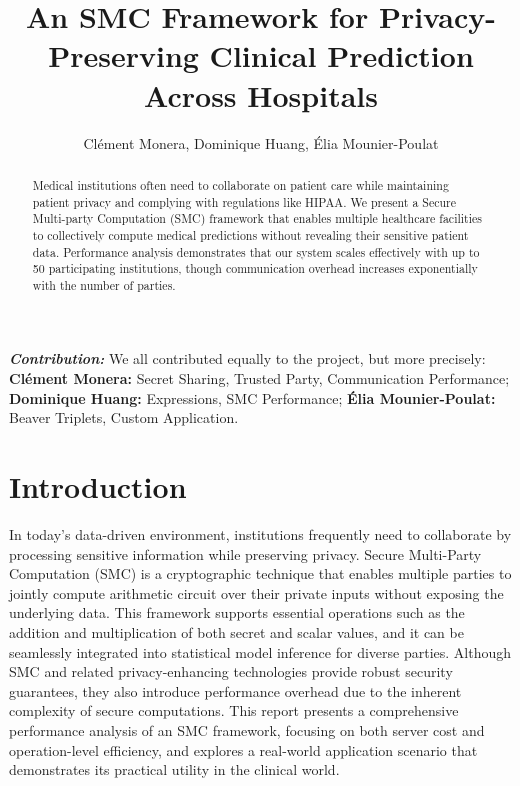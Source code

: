 \documentclass[10pt,conference,compsocconf]{IEEEtran}
\title{An SMC Framework for Privacy-Preserving Clinical Prediction Across Hospitals}
\author{Clément Monera, Dominique Huang, Élia Mounier-Poulat}
\date{}
\begin{document}
\maketitle

\begin{abstract}
     Medical institutions often need to collaborate on patient care while maintaining patient privacy and complying with regulations like HIPAA. We present a Secure Multi-party Computation (SMC) framework that enables multiple healthcare facilities to collectively compute medical predictions without revealing their sensitive patient data. Performance analysis demonstrates that our system scales effectively with up to 50 participating institutions, though communication overhead increases exponentially with the number of parties.%
\end{abstract}

\vspace{1em} 

\noindent\textbf{\textit{Contribution:}} We all contributed equally to the project, but more precisely:
\textbf{Clément Monera:} Secret Sharing, Trusted Party, Communication Performance; \textbf{Dominique Huang:} Expressions, SMC Performance; \textbf{Élia Mounier-Poulat:} Beaver Triplets, Custom Application.

\section{Introduction}

In today's data-driven environment, institutions frequently need to collaborate by processing sensitive information while preserving privacy. Secure Multi-Party Computation (SMC) is a cryptographic technique that enables multiple parties to jointly compute arithmetic circuit over their private inputs without exposing the underlying data. This framework supports essential operations such as the addition and multiplication of both secret and scalar values, and it can be seamlessly integrated into statistical model inference for diverse parties. Although SMC and related privacy-enhancing technologies provide robust security guarantees, they also introduce performance overhead due to the inherent complexity of secure computations. This report presents a comprehensive performance analysis of an SMC framework, focusing on both server cost and operation-level efficiency, and explores a real-world application scenario that demonstrates its practical utility in the clinical world.
\end{document}

